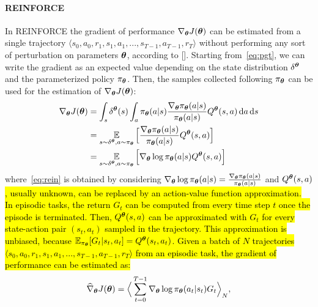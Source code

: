 \paragraph{REINFORCE} \label{subsec:rein}
In REINFORCE the gradient of performance $\nabla_{\boldsymbol{\theta}}J(\boldsymbol{\theta})$ can be estimated from a single trajectory $\langle s_0, a_0, r_1, s_1, a_1, ..., s_{T-1}, a_{T-1}, r_{T} \rangle$ without performing any sort of perturbation on parameters $\boldsymbol{\theta}$, according to [\cite{Williams1992SimpleSG}]. Starting from~\eqref{eq:pgt}, we can write the gradient as an expected value depending on the state distribution $\delta^{\boldsymbol{\theta}}$ and the parameterized policy $\pi_{\boldsymbol{\theta}}$. Then, the samples collected following $\pi_{\boldsymbol{\theta}}$ can be used for the estimation of $\nabla_{\boldsymbol{\theta}}J(\boldsymbol{\theta})$: 
\begin{align}
\nabla_{\boldsymbol{\theta}}J(\boldsymbol{\theta}) &= \int_s \delta^{\boldsymbol{\theta}}(s) \int_a \pi_{\boldsymbol{\theta}}(a|s) \frac{\nabla_{\boldsymbol{\theta}} \pi_{\boldsymbol{\theta}}(a|s)}{\pi_{\boldsymbol{\theta}}(a|s)} Q^{\boldsymbol{\theta}}(s,a) \,\mathrm{d} a \,\mathrm{d} s \nonumber\\
&= \operatorname*{\mathbb{E}}_{s \sim \delta^{\boldsymbol{\theta}}, a \sim \pi_{\boldsymbol{\theta}}} \Big[ \frac{\nabla_{\boldsymbol{\theta}} \pi_{\boldsymbol{\theta}}(a|s)}{\pi_{\boldsymbol{\theta}}(a|s)} Q^{\boldsymbol{\theta}}(s,a) \Big] \nonumber\\
&= \operatorname*{\mathbb{E}}_{s \sim \delta^{\boldsymbol{\theta}}, a \sim \pi_{\boldsymbol{\theta}}} \Big[ \nabla_{\boldsymbol{\theta}} \log\pi_{\boldsymbol{\theta}}(a|s) Q^{\boldsymbol{\theta}}(s,a) \Big] \label{eq:rein}
\end{align}
where~\eqref{eq:rein} is obtained by considering $\nabla_{\boldsymbol{\theta}} \log\pi_{\boldsymbol{\theta}}(a|s) = \frac{\nabla_{\boldsymbol{\theta}} \pi_{\boldsymbol{\theta}}(a|s)}{\pi_{\boldsymbol{\theta}}(a|s)}$ and $Q^{\boldsymbol{\theta}}(s, a)$\hl{, usually unknown, can be replaced by an action-value function approximation.}\\
\newline
\hl{In episodic tasks, the return $G_t$ can be computed from every time step $t$ once the episode is terminated. Then, $Q^{\boldsymbol{\theta}}(s, a)$ can be approximated with $G_{t}$ for every state-action pair $(s_t, a_t)$ sampled in the trajectory. This approximation is unbiased, because $\operatorname*{\mathbb{E}}_{\pi_{\boldsymbol{\theta}}}[G_t | s_t, a_t] = Q^{\boldsymbol{\theta}}(s_t, a_t)$.
Given a batch of $N$ trajectories $\langle s_0, a_0, r_1, s_1, a_1, ..., s_{T-1}, a_{T-1}, r_{T} \rangle$ from an episodic task, the gradient of performance can be estimated as:}
\begin{align}
	\widehat{\nabla}_{\boldsymbol{\theta}}J(\boldsymbol{\theta}) = \Big\langle \sum_{t=0}^{T-1} \nabla_{\boldsymbol{\theta}} \log\pi_{\boldsymbol{\theta}}(a_t|s_t) G_{t} \Big\rangle_{N}, \label{eq:estrein}
\end{align}
